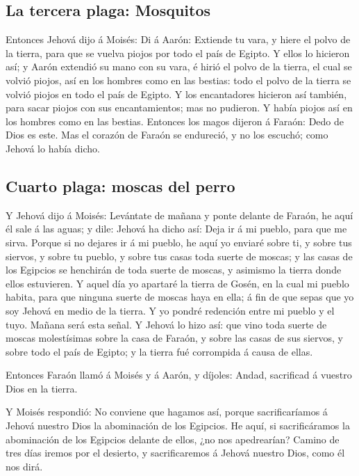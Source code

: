 \hypertarget{la-tercera-plaga-mosquitos}{%
\subsection{La tercera plaga:
Mosquitos}\label{la-tercera-plaga-mosquitos}}

 Entonces Jehová dijo á Moisés: Di á Aarón: Extiende tu
vara, y hiere el polvo de la tierra, para que se vuelva piojos por todo
el país de Egipto.  Y ellos lo hicieron así; y Aarón
extendió su mano con su vara, é hirió el polvo de la tierra, el cual se
volvió piojos, así en los hombres como en las bestias: todo el polvo de
la tierra se volvió piojos en todo el país de Egipto.  Y
los encantadores hicieron así también, para sacar piojos con sus
encantamientos; mas no pudieron. Y había piojos así en los hombres como
en las bestias.  Entonces los magos dijeron á Faraón:
Dedo de Dios es este. Mas el corazón de Faraón se endureció, y no los
escuchó; como Jehová lo había dicho.

\hypertarget{cuarto-plaga-moscas-del-perro}{%
\subsection{Cuarto plaga: moscas del
perro}\label{cuarto-plaga-moscas-del-perro}}

 Y Jehová dijo á Moisés: Levántate de mañana y ponte
delante de Faraón, he aquí él sale á las aguas; y dile: Jehová ha dicho
así: Deja ir á mi pueblo, para que me sirva.  Porque si
no dejares ir á mi pueblo, he aquí yo enviaré sobre ti, y sobre tus
siervos, y sobre tu pueblo, y sobre tus casas toda suerte de moscas; y
las casas de los Egipcios se henchirán de toda suerte de moscas, y
asimismo la tierra donde ellos estuvieren.  Y aquel día
yo apartaré la tierra de Gosén, en la cual mi pueblo habita, para que
ninguna suerte de moscas haya en ella; á fin de que sepas que yo soy
Jehová en medio de la tierra.  Y yo pondré redención
entre mi pueblo y el tuyo. Mañana será esta señal.  Y
Jehová lo hizo así: que vino toda suerte de moscas molestísimas sobre la
casa de Faraón, y sobre las casas de sus siervos, y sobre todo el país
de Egipto; y la tierra fué corrompida á causa de ellas.

 Entonces Faraón llamó á Moisés y á Aarón, y díjoles:
Andad, sacrificad á vuestro Dios en la tierra.

 Y Moisés respondió: No conviene que hagamos así, porque
sacrificaríamos á Jehová nuestro Dios la abominación de los Egipcios. He
aquí, si sacrificáramos la abominación de los Egipcios delante de ellos,
¿no nos apedrearían?  Camino de tres días iremos por el
desierto, y sacrificaremos á Jehová nuestro Dios, como él nos dirá.


